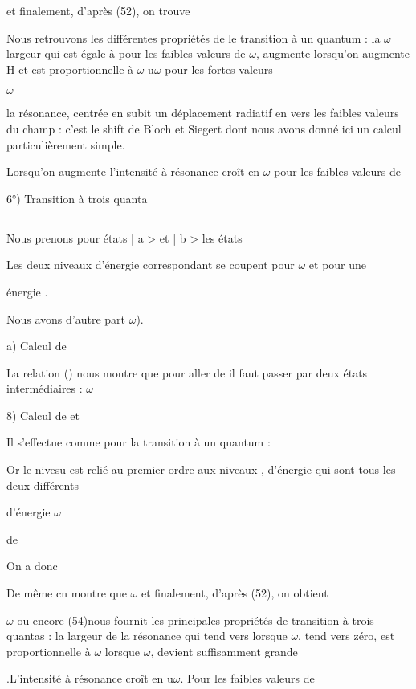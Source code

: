 et finalement, d'après (52), on trouve

Nous retrouvons les différentes propriétés de le transition à un quantum : la
$\omega$
largeur qui est égale à  pour les faibles valeurs de $\omega$, augmente lorsqu'on
augmente H et est proportionnelle à $\omega$ u$\omega$ pour les fortes valeurs


$\omega$

la résonance, centrée en  subit un déplacement radiatif en
 vers les faibles valeurs du champ : c'est le shift de Bloch et Siegert
dont nous avons donné ici un calcul particulièrement simple.

Lorsqu'on augmente  l'intensité à résonance croît en $\omega$ pour
les faibles valeurs de 

6°) Transition à trois quanta
\subsection{}%

Nous prenons pour états | a > et | b > les états

Les deux niveaux d'énergie correspondant se coupent pour $\omega$ et pour une

énergie .

Nous avons d'autre part $\omega$).

a) Calcul de 

La relation () nous montre que pour aller de 
il faut passer par deux états intermédiaires :
$\omega$

8) Calcul de  et 

Il s'effectue comme pour la transition à un quantum :


Or le nivesu  est relié au premier ordre aux
niveaux , d'énergie  qui sont tous les deux différents

d'énergie $\omega$

de

On a donc

De même cn montre que
$\omega$
et finalement, d'après (52), on obtient

$\omega$
ou encore
(54)nous fournit les principales propriétés de  transition à trois quantas :
la largeur de la résonance  qui tend vers  lorsque
$\omega$, tend vers zéro, est proportionnelle à $\omega$  lorsque $\omega$, devient suffisamment grande


.L'intensité à résonance croît en u$\omega$. Pour les faibles valeurs de

